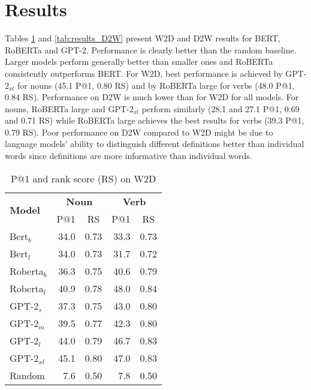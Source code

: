 \documentclass[11pt,a4paper]{article}
\begin{document}
\section{Results}

Tables \ref{tab:results_W2D} and \ref{tab:results_D2W}
present W2D and D2W results for BERT, RoBERTa and
GPT-2. Performance is clearly better than the random
baseline.  Larger models perform generally better than
smaller ones and RoBERTa consistently outperforms BERT.  For
W2D, best performance is achieved by GPT-2$_{xl}$ for nouns
(45.1 P@1, 0.80 RS) and by RoBERTa large for verbs (48.0
P@1, 0.84 RS). Performance on D2W is much lower than for W2D
for all models. For nouns, RoBERTa large and GPT-2$_{xl}$
perform similarly (28.1 and 27.1 P@1, 0.69 and 0.71 RS)
while RoBERTa large achieves the best results for verbs
(39.3 P@1, 0.79 RS).  Poor performance on D2W compared to
W2D might be due to language models' ability to distinguish
different definitions better than individual words since
definitions are more informative than individual words.



\begin{table}
    \centering
    \begin{tabular}{l|rrrr}
        \hline
         \multirow{2}{*}{\textbf{Model}} & \multicolumn{2}{c}{\textbf{Noun}} & \multicolumn{2}{c}{\textbf{Verb}} \\
         & \multicolumn{1}{c}{P@1} & \multicolumn{1}{c}{RS} & \multicolumn{1}{c}{P@1} & \multicolumn{1}{c}{RS} \\ \hline
     Bert$_{b}$ & 34.0 & 0.73 & 33.3 & 0.73 \\
     Bert$_{l}$ & 34.0 & 0.73 & 31.7 & 0.72 \\
     Roberta$_{b}$ & 36.3 & 0.75 & 40.6 & 0.79 \\
     Roberta$_{l}$ & 40.9 & 0.78 & 48.0 & 0.84 \\ \hline
     GPT-2$_{s}$ & 37.3 & 0.75 & 43.0 & 0.80 \\
     GPT-2$_{m}$ & 39.5 & 0.77 & 42.3 & 0.80 \\
     GPT-2$_{l}$ & 44.0 & 0.79 & 46.7 & 0.83 \\
     GPT-2$_{xl}$ & 45.1 & 0.80 & 47.0 & 0.83 \\ \hline 
     Random & 7.6 & 0.50 & 7.8 & 0.50 \\\hline
     
    \end{tabular}
    \caption{P@1 and rank score (RS) on W2D}
    \label{tab:results_W2D}
\end{table}
\end{document}
